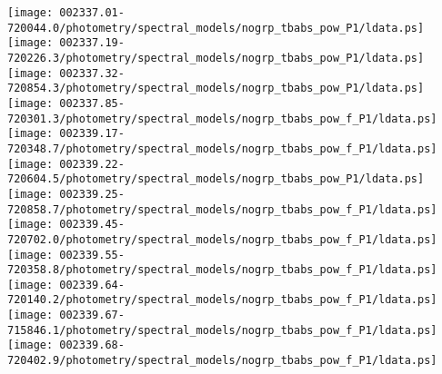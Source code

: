 \documentclass{aastex}
\begin{document}
\begin{figure*}[!ht]
\centering
\texttt{[image: 002337.01-720044.0/photometry/spectral\_models/nogrp\_tbabs\_pow\_P1/ldata.ps]} \hfill 
\texttt{[image: 002337.19-720226.3/photometry/spectral\_models/nogrp\_tbabs\_pow\_P1/ldata.ps]} \hfill 
\texttt{[image: 002337.32-720854.3/photometry/spectral\_models/nogrp\_tbabs\_pow\_P1/ldata.ps]} \\ 
\vspace*{0.5in}
\texttt{[image: 002337.85-720301.3/photometry/spectral\_models/nogrp\_tbabs\_pow\_f\_P1/ldata.ps]} \hfill 
\texttt{[image: 002339.17-720348.7/photometry/spectral\_models/nogrp\_tbabs\_pow\_f\_P1/ldata.ps]} \hfill 
\texttt{[image: 002339.22-720604.5/photometry/spectral\_models/nogrp\_tbabs\_pow\_P1/ldata.ps]} \\ 
\vspace*{0.5in}
\texttt{[image: 002339.25-720858.7/photometry/spectral\_models/nogrp\_tbabs\_pow\_f\_P1/ldata.ps]} \hfill 
\texttt{[image: 002339.45-720702.0/photometry/spectral\_models/nogrp\_tbabs\_pow\_f\_P1/ldata.ps]} \hfill 
\texttt{[image: 002339.55-720358.8/photometry/spectral\_models/nogrp\_tbabs\_pow\_f\_P1/ldata.ps]} \\ 
\vspace*{0.5in}
\texttt{[image: 002339.64-720140.2/photometry/spectral\_models/nogrp\_tbabs\_pow\_f\_P1/ldata.ps]} \hfill 
\texttt{[image: 002339.67-715846.1/photometry/spectral\_models/nogrp\_tbabs\_pow\_f\_P1/ldata.ps]} \hfill 
\texttt{[image: 002339.68-720402.9/photometry/spectral\_models/nogrp\_tbabs\_pow\_f\_P1/ldata.ps]} \\ 
\vspace*{0.5in}
\end{figure*}
\clearpage
\end{document}
